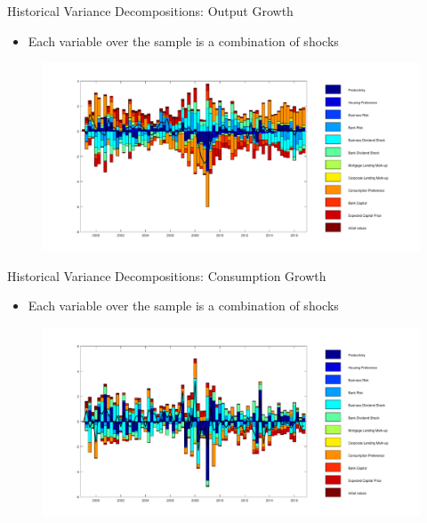 \documentclass[8pt,aspectratio=169]{beamer}
\numberwithin{equation}{section}
\begin{document}
\begin{frame}{Historical Variance Decompositions: Output   Growth }

\begin{itemize}

\item Each variable over the sample is a combination of shocks
\end{itemize}

\begin{figure}
\includegraphics[scale=0.36]{decomp_dy.pdf}
\end{figure}


\end{frame}



\begin{frame}{Historical Variance Decompositions: Consumption Growth }

\begin{itemize}

\item Each variable over the sample is a combination of shocks
\end{itemize}

\begin{figure}
\includegraphics[scale=0.36]{decomp_dc.pdf}
\end{figure}


\end{frame}
\end{document}
